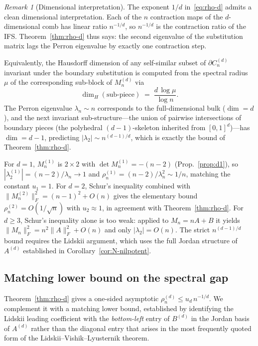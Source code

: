 \documentclass{amsart}
\theoremstyle{definition}
\theoremstyle{remark}
\newtheorem{remark}[theorem]{Remark}
\begin{document}
\begin{remark}[Dimensional interpretation]
\label{ssec:monopole-d}
The exponent $1/d$ in~\eqref{eq:rho-d} admits a clean dimensional
interpretation.  Each of the $n$ contraction maps of the
$d$-dimensional comb has linear ratio $n^{-1/d}$, so $n^{-1/d}$ is
the contraction ratio of the IFS.
Theorem~\ref{thm:rho-d} thus says: the second
eigenvalue of the substitution matrix lags the Perron eigenvalue
by exactly one contraction step.

Equivalently, the Hausdorff dimension of any self-similar subset
of $\partial C_n^{(d)}$ invariant under the boundary substitution
is computed from the spectral radius~$\mu$ of the corresponding
sub-block of $M_n^{(d)}$ via
\begin{equation}\label{eq:rho-d-dimension}
  \dim_H (\text{sub-piece}) \;=\; \frac{d \,\log\mu}{\log n}.
\end{equation}
The Perron eigenvalue $\lambda_n \sim n$ corresponds to the
full-dimensional bulk ($\dim = d$), and the next invariant
sub-structure---the union of pairwise intersections of boundary
pieces (the polyhedral $(d-1)$-skeleton inherited from
$[0,1]^d$)---has $\dim = d-1$, predicting
$|\lambda_2| \sim n^{(d-1)/d}$, which is exactly the bound of
Theorem~\ref{thm:rho-d}.

For $d = 1$, $M_n^{(1)}$ is $2 \times 2$ with
$\det M_n^{(1)} = -(n{-}2)$ (Prop.~\ref{prop:d1}), so
$|\lambda_2^{(1)}| = (n{-}2)/\lambda_n \to 1$ and
$\rho_n^{(1)} = (n{-}2)/\lambda_n^2 \sim 1/n$, matching
the constant $u_1 = 1$.  For $d = 2$, Schur's inequality combined with
$\|M_n^{(2)}\|_F^2 = (n{-}1)^2 + O(n)$ gives the elementary bound
$\rho_n^{(2)} = O(1/\sqrt n)$ with $u_2 \approx 1$, in agreement
with Theorem~\ref{thm:rho-d}.  For $d \ge 3$,
Schur's inequality alone is too weak: applied to
$M_n = n A + B$ it yields $\|M_n\|_F^2 = n^2 \|A\|_F^2 + O(n)$
and only $|\lambda_2| = O(n)$.  The strict $n^{(d-1)/d}$ bound
requires the Lidskii argument, which uses the full Jordan
structure of $A^{(d)}$ established in
Corollary~\ref{cor:N-nilpotent}.
\end{remark}

\subsection{Matching lower bound on the spectral gap}
\label{ssec:rho-lower}

Theorem~\ref{thm:rho-d} gives a one-sided
asymptotic $\rho_n^{(d)} \le u_d\, n^{-1/d}$.  We complement it
with a matching lower bound, established by identifying the
Lidskii leading coefficient with the \emph{bottom-left} entry of
$B^{(d)}$ in the Jordan basis of $A^{(d)}$ rather than the
diagonal entry that arises in the most frequently quoted form
of the Lidskii--Vishik--Lyusternik theorem.
\end{document}
